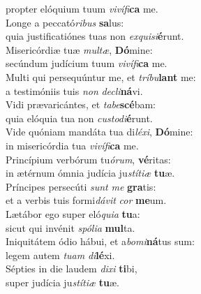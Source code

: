 \evenverse propter elóquium tuum \textit{vi}\textit{ví}\textit{fi}\textbf{ca} me.\\
\oddverse Longe a peccató\textit{ri}\textit{bus} \textbf{sa}lus:~\*\\
\oddverse quia justificatiónes tuas non \textit{ex}\textit{qui}\textit{si}\textbf{é}runt.\\
\evenverse Misericórdiæ tuæ \textit{mul}\textit{tæ}, \textbf{Dó}mine:~\*\\
\evenverse secúndum judícium tuum \textit{vi}\textit{ví}\textit{fi}\textbf{ca} me.\\
\oddverse Multi qui persequúntur me, et \textit{trí}\textit{bu}\textbf{lant} me:~\*\\
\oddverse a testimóniis tuis \textit{non} \textit{de}\textit{cli}\textbf{ná}vi.\\
\evenverse Vidi prævaricántes, et \textit{ta}\textit{be}\textbf{scé}bam:~\*\\
\evenverse quia elóquia tua non \textit{cu}\textit{sto}\textit{di}\textbf{é}runt.\\
\oddverse Vide quóniam mandáta tua di\textit{lé}\textit{xi}, \textbf{Dó}mine:~\*\\
\oddverse in misericórdia tua \textit{vi}\textit{ví}\textit{fi}\textbf{ca} me.\\
\evenverse Princípium verbórum tu\textit{ó}\textit{rum}, \textbf{vé}ritas:~\*\\
\evenverse in ætérnum ómnia judícia ju\textit{stí}\textit{ti}\textit{æ} \textbf{tu}æ.\\
\oddverse Príncipes persecúti \textit{sunt} \textit{me} \textbf{gra}tis:~\*\\
\oddverse et a verbis tuis formi\textit{dá}\textit{vit} \textit{cor} \textbf{me}um.\\
\evenverse Lætábor ego super eló\textit{qui}\textit{a} \textbf{tu}a:~\*\\
\evenverse sicut qui invénit \textit{spó}\textit{li}\textit{a} \textbf{mul}ta.\\
\oddverse Iniquitátem ódio hábui, et a\textit{bo}\textit{mi}\textbf{ná}tus sum:~\*\\
\oddverse legem autem \textit{tu}\textit{am} \textit{di}\textbf{lé}xi.\\
\evenverse Sépties in die laudem \textit{di}\textit{xi} \textbf{ti}bi,~\*\\
\evenverse super judícia ju\textit{stí}\textit{ti}\textit{æ} \textbf{tu}æ.\\
